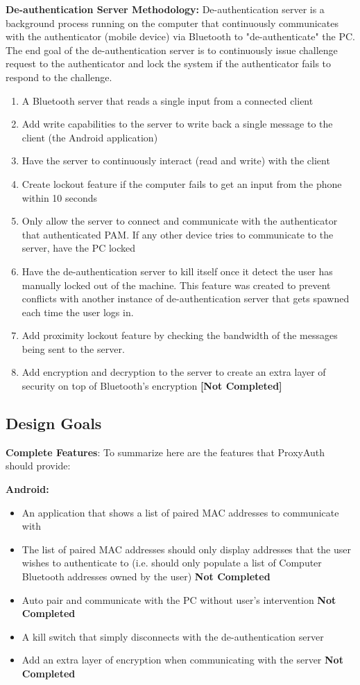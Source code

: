\documentclass[letterpaper,twocolumn,10pt]{article}
\begin{document}
\textbf{De-authentication Server Methodology:} De-authentication server is a background process running on the computer that continuously communicates with the authenticator (mobile device) via Bluetooth to "de-authenticate" the PC. The end goal of the de-authentication server is to continuously issue challenge request to the authenticator and lock the system if the authenticator fails to respond to the challenge.
\begin{enumerate}
\item A Bluetooth server that reads a single input from a connected client
\item Add write capabilities to the server to write back a single message to the client (the Android application)
\item Have the server to continuously interact (read and write) with the client
\item Create lockout feature if the computer fails to get an input from the phone within 10 seconds
\item Only allow the server to connect and communicate with the authenticator that authenticated PAM. If any other device tries to communicate to the server, have the PC locked
\item Have the de-authentication server to kill itself once it detect the user has manually locked out of the machine. This feature was created to prevent conflicts with another instance of de-authentication server that gets spawned each time the user logs in.
\item Add proximity lockout feature by checking the bandwidth of the messages being sent to the server.
\item Add encryption and decryption to the server to create an extra layer of security on top of Bluetooth's encryption \textbf{[Not Completed]}
\end{enumerate}

\subsection{Design Goals}
\large \textbf{Complete Features}:
\normalsize To summarize here are the features that ProxyAuth should provide:

\textbf{Android:}
\begin{itemize}[noitemsep]
\item An application that shows a list of paired MAC addresses to communicate with
\item The list of paired MAC addresses should only display addresses that the user wishes to authenticate to (i.e. should only populate a list of Computer Bluetooth addresses owned by the user) \textbf{Not Completed}
\item Auto pair and communicate with the PC without user's intervention \textbf{Not Completed}
\item A kill switch that simply disconnects with the de-authentication server
\item Add an extra layer of encryption when communicating with the server \textbf{Not Completed}
\end{itemize}
\end{document}
